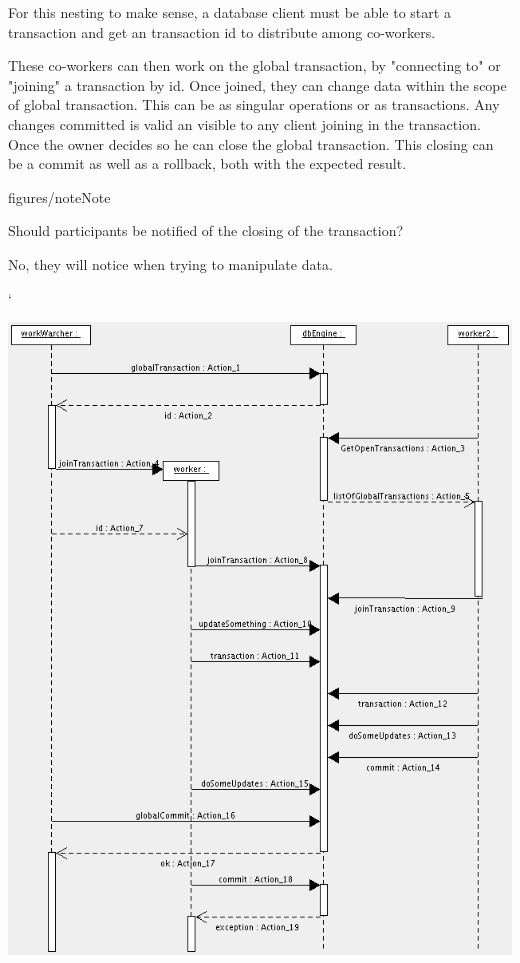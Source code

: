 \documentclass[]{lofar}
\begin{document}
     For this nesting to make sense, a database client must be able to
     start a transaction and get an transaction id to distribute among
     co-workers.

    



     These co-workers can then work on the global transaction, by
     "connecting to" or "joining" a transaction
     by id. Once joined, they can change data within the scope of global
     transaction. This can be as singular operations or as
     transactions. Any changes committed is valid an visible to any
     client joining in the transaction. Once the owner decides so he can
     close the global transaction. This closing can be a commit as well
     as a rollback, both with the expected result.

     
\begin{admonition}{figures/note}{Note}%



       Should participants be notified of the closing of the transaction?

      



       No, they will notice when trying to manipulate data.

      


   ` \end{admonition}

{{\includegraphics[]{nestedTransaction.png}}}
\end{document}
